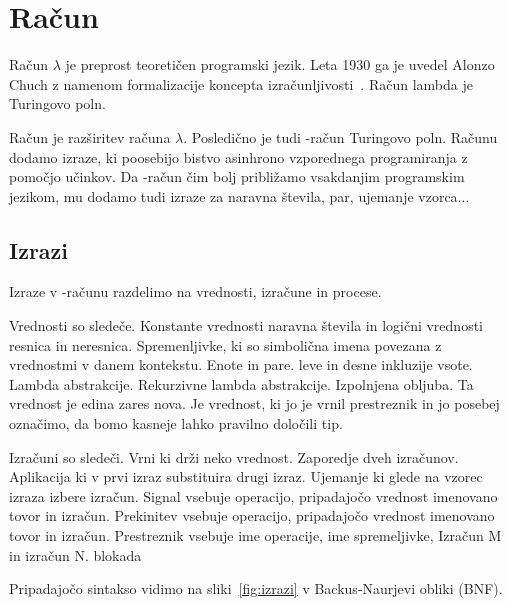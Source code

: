 \section{Račun \lae{}}\label{sec:lae}

Račun $\lambda$ je preprost teoretičen programski jezik. Leta 1930 ga je uvedel Alonzo Chuch z namenom formalizacije koncepta izračunljivosti~\cite{rojas2015tutorial}. Račun lambda je Turingovo poln.


Račun \lae{} je razširitev računa $\lambda$. Posledično je tudi \lae{}-račun Turingovo poln. Računu \lae{} dodamo izraze, ki poosebijo bistvo asinhrono vzporednega programiranja z pomočjo učinkov. Da \lae{}-račun čim bolj približamo vsakdanjim programskim jezikom, mu dodamo tudi izraze za  naravna števila, par, ujemanje vzorca...


\subsection{Izrazi}

Izraze v \lae{}-računu razdelimo na vrednosti, izračune in procese. 


Vrednosti so sledeče.
Konstante vrednosti naravna števila in logični vrednosti resnica in neresnica.
Spremenljivke, ki so simbolična imena povezana z vrednostmi v danem kontekstu.
Enote in pare.
leve in desne inkluzije vsote.
Lambda abstrakcije.
Rekurzivne lambda abstrakcije.
Izpolnjena obljuba. Ta vrednost je edina zares nova. Je vrednost, ki jo je vrnil prestreznik in jo posebej označimo, da bomo kasneje lahko pravilno določili tip.


Izračuni so sledeči.
Vrni ki drži neko vrednost.
Zaporedje dveh izračunov.
Aplikacija ki v prvi izraz substituira drugi izraz.
Ujemanje ki glede na vzorec izraza izbere izračun. 
Signal vsebuje operacijo, pripadajočo vrednost imenovano tovor in izračun.
Prekinitev vsebuje operacijo, pripadajočo vrednost imenovano tovor in izračun.
Prestreznik vsebuje ime operacije, ime spremeljivke, Izračun M in izračun N.
blokada


Pripadajočo sintakso vidimo na sliki~\ref{fig:izrazi} v Backus-Naurjevi obliki (BNF).



